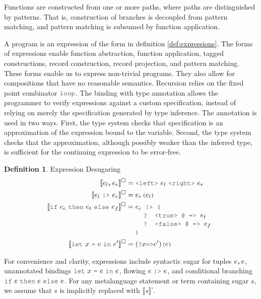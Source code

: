 \documentclass[acmsmall]{acmart}
\theoremstyle{definition}
\newtheorem{definition}{Definition}[section]
\begin{document}
Functions are constructed from one or more paths, where paths are distinguished by patterns. 
That is, construction of branches is decoupled from pattern matching, and pattern matching is
subsumed by function application.


A program is an expression 
of the form in definition \ref{def:expressions}. The forms of expressions
enable function abstraction, function application, tagged constructions, record construction, record projection,
and pattern matching. These forms enable us to express non-trivial programs. They also allow
for compositions that have no reasonable semantics.  
Recursion relies on the fixed point combinator $\J{loop}$.
The binding with type annotation allows the programmer to verify expressions against
a custom specification, instead of relying on merely the specification generated by type inference.
The annotation is used in two ways. First, the type system checks that specification is an approximation
of the expression bound to the variable. Second, the type system checks that the approximation,
although possibly weaker than the inferred type, is sufficient for the continuing expression to be error-free. 

\hfill
\begin{definition} 
  \label{def:expression_desugaring}
  Expression Desugaring
  \hfill 
  \\
  \begin{align*}
      \llbracket e_l \J{,} e_r \rrbracket^\square &= \J{<left>}\ e_l \ \J{<right>}\ e_r
      \\
      \llbracket e_l\ \J{|>}\ e_r \rrbracket^\square &= e_r\J{(}e_l\J{)}
      \\
      \llbracket \J{if}\ e_c\ \J{then}\ e_t\ \J{else}\ e_f \rrbracket^\square &= 
      \begin{array}[t]{@{} l}
        e_c \J{ |> (}
          \\
          \I \J{? <true> @ => } e_t
          \\
          \I \J{? <false> @ => } e_f
          \\
        \J{)}
      \end{array}
      \\
      \llbracket \J{let}\ x\ \J{=}\ e\ \J{in}\ e' \rrbracket^\square &= (\J{?}x \J{=>} e')\J{(}e\J{)}
  \end{align*}

\end{definition} 
\hfill

For convenience and clarity, expressions include syntactic sugar for tuples $e\J{,}e$, 
unannotated bindings \hfill \break
$\J{let}\ x\ \J{=}\ e\ \J{in}\ e$,
flowing $e\ \J{|>}\ e$,
and conditional branching $\J{if}\ e\ \J{then}\ e\ \J{else}\ e$.
For any metalanguage statement or term containing sugar $s$, we assume that $s$ is implicitly replaced with $\llbracket s \rrbracket^\square$.
\end{document}
